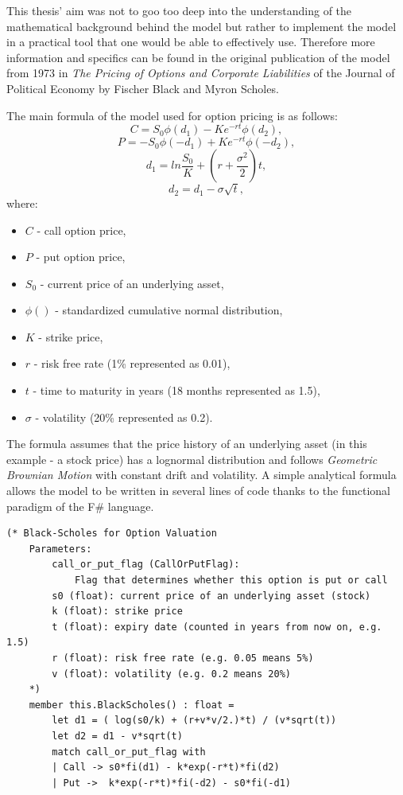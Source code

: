     This thesis' aim was not to goo too deep into the understanding of the mathematical background behind the model but rather to implement the model in a practical tool that one would be able to effectively use. Therefore more information and specifics can be found in the original publication \cite{10.2307/1831029} of the model from 1973 in \textit{The Pricing of Options and Corporate Liabilities} of the Journal of Political Economy by Fischer Black and Myron Scholes.
    
    The main formula of the model used for option pricing is as follows:
    \[
    C = S_0\phi(d_1) - Ke^{-rt}\phi(d_2)
    ,
    \]
    \[
    P = -S_0\phi(-d_1) + Ke^{-rt}\phi(-d_2)
    ,
    \]
    \[
    d_1 = ln\frac{S_0}{K} + (r+\frac{\sigma^2}{2})t
    ,
    \]
    \[
    d_2 = d_1 - \sigma\sqrt{t}
    ,
    \]
    where:
    \begin{itemize}
        \item $C$ - call option price,
        \item $P$ - put option price,
        \item $S_0$ - current price of an underlying asset,
        \item $\phi()$ - standardized cumulative normal distribution,
        \item $K$ - strike price,
        \item $r$ - risk free rate (1\% represented as 0.01),
        \item $t$ - time to maturity in years (18 months represented as 1.5),
        \item $\sigma$ - volatility (20\% represented as 0.2).
    \end{itemize}
    The formula assumes that the price history of an underlying asset (in this example - a stock price) has a lognormal distribution and follows \textit{Geometric Brownian Motion} with constant drift and volatility. 
    A simple analytical formula allows the model to be written in several lines of code thanks to the functional paradigm of the F\# language.
    \begin{lstlisting}[label={lst:bsm}, caption=F\# implementation of \textit{Black--Scholes Model}.]
    (* Black-Scholes for Option Valuation
    Parameters:
        call_or_put_flag (CallOrPutFlag):
            Flag that determines whether this option is put or call
        s0 (float): current price of an underlying asset (stock)
        k (float): strike price
        t (float): expiry date (counted in years from now on, e.g. 1.5)
        r (float): risk free rate (e.g. 0.05 means 5%)
        v (float): volatility (e.g. 0.2 means 20%)
    *)
    member this.BlackScholes() : float =
        let d1 = ( log(s0/k) + (r+v*v/2.)*t) / (v*sqrt(t))
        let d2 = d1 - v*sqrt(t)
        match call_or_put_flag with
        | Call -> s0*fi(d1) - k*exp(-r*t)*fi(d2)
        | Put ->  k*exp(-r*t)*fi(-d2) - s0*fi(-d1)
    \end{lstlisting}